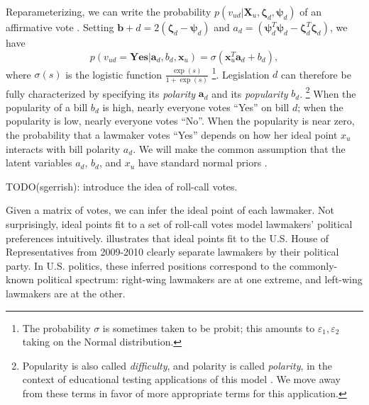 Reparameterizing, we can write the probability $p(v_{ud} | \bm X_u, \bm \zeta_d,
 \bm \psi_d)$ of an affirmative vote
 \citep{clinton:2004}.  Setting $\bm b+d = 2 (\bm \zeta_d
 - \bm \psi_d )$ and $a_d = (\bm \psi_d^T \bm \psi_d - \bm \zeta_d^T
 \bm \zeta_d )$, we have
\begin{equation}
  p(v_{ud} = \textbf{Yes} | \bm a_d, b_d, \bm x_u) = \sigma ( \bm x_u^T \bm a_d + b_d ),
  \label{eq:trad_ipm}
\end{equation}
where $\sigma(s)$ is the logistic function $\frac{\exp(s)}{1 +
  \exp(s)}$ \footnote{The probability $\sigma$ is sometimes taken to
  be probit; this amounts to $\varepsilon_1, \varepsilon_2$ taking on
  the Normal distribution.}.  Legislation $d$ can therefore be fully
characterized by specifying its \emph{polarity} $\bm a_d$ and its
\emph{popularity} $b_d$. \footnote{Popularity is also called
  \emph{difficulty}, and polarity is called \emph{polarity}, in the
  context of educational testing applications of this model
  \citep{clinton:2004}.  We move away from these terms in favor of more
  appropriate terms for this application.}  When the popularity of a
bill $b_d$ is high, nearly everyone votes ``Yes'' on bill $d$; when
the popularity is low, nearly everyone votes ``No''.  When the
popularity is near zero, the probability that a lawmaker votes ``Yes''
depends on how her ideal point $x_u$ interacts with bill polarity
$a_d$.  We will make the common assumption that the latent variables
$a_d$, $b_d$, and $x_u$ have standard normal priors
\citep{clinton:2004}.

TODO(sgerrish): introduce the idea of roll-call votes.

Given a matrix of votes, we can infer the ideal point of each
lawmaker.  Not surprisingly, ideal points fit to a set of roll-call
votes model lawmakers' political preferences intuitively.  
 illustrates that ideal points
fit to the U.S. House of Representatives from 2009-2010 clearly
separate lawmakers by their political party.  In U.S. politics, these
inferred positions correspond to the commonly-known political
spectrum: right-wing lawmakers are at one extreme, and left-wing
lawmakers are at the other. %



